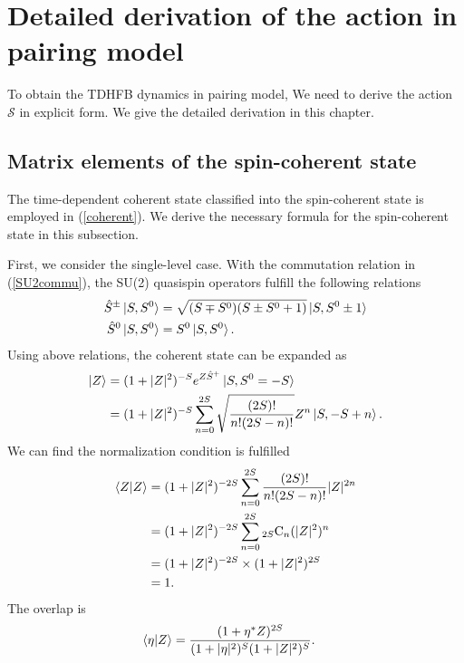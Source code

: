 \documentclass[11pt]{book} %
\begin{document}
\clearpage{\pagestyle{empty}\cleardoublepage}
\appendix

\chapter{Detailed derivation of the action in pairing model}
\label{derivation}
To obtain the TDHFB dynamics in pairing model, We need to derive the action $\mathcal{S}$ in explicit form. We give the detailed derivation in this chapter.

\section{Matrix elements of the spin-coherent state}
\label{formula1}
The time-dependent coherent state classified into the spin-coherent state is employed in (\ref{coherent}). We derive the necessary formula for the spin-coherent state in this subsection. \par
First, we consider the single-level case.
With the commutation relation in (\ref{SU2commu}), the SU(2) quasispin operators fulfill the following relations
\begin{align}
  \hat{S}^{\pm}\ket{S,S^0} &= \sqrt{(S\mp S^0)(S\pm S^0+1)} \ket{S,S^0\pm 1}
  \label{S_pm} \\
  \hat{S}^0\ket{S,S^0} &= S^0\ket{S,S^0} .
  \label{S_0}
\end{align}
Using above relations, the coherent state can be expanded as 
\begin{align}
  \ket{Z} &= (1+|Z|^2)^{-S}e^{Z \hat{S}^+}\ket{S,S^0=-S} \nonumber \\
  &= (1+|Z|^2)^{-S}\sum_{n=0}^{2S}\sqrt{\frac{(2S)!}{n!(2S-n)!}}Z^n\ket{S,-S+n} .
\end{align}
We can find the normalization condition is fulfilled
\begin{align}
  \braket{Z|Z} &= (1+|Z|^2)^{-2S}\sum_{n=0}^{2S}\frac{(2S)!}{n!(2S-n)!}|Z|^{2n} \nonumber \\
  &= (1+|Z|^2)^{-2S}\sum_{n=0}^{2S} {}_{2S}\mathrm{C}_n(|Z|^2)^n \nonumber \\
  &= (1+|Z|^2)^{-2S}\times(1+|Z|^2)^{2S} \nonumber \\
  &= 1 .
\end{align}
The overlap is
\begin{align}
  \braket{\eta|Z} &= \frac{(1+\eta^*Z)^{2S}}{(1+|\eta|^2)^S(1+|Z|^2)^S} .
\end{align}
\end{document}
